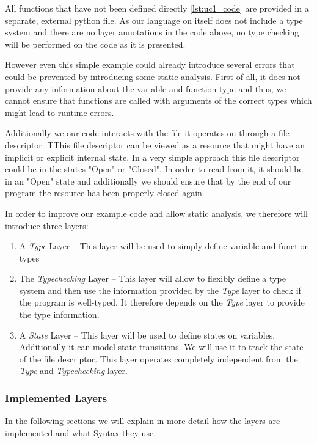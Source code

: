 \documentclass[acmsmall, review, screen]{acmart}
\begin{document}
All functions that have not been defined directly \ref{lst:uc1_code} are provided in a separate, external python file. As our language on itself does not include a type system and there are no layer annotations in the code above, no type checking will be performed on the code as it is presented.

However even this simple example could already introduce several errors that could be prevented by introducing some static analysis. First of all, it does not provide any information about the variable and function type and thus, we cannot ensure that functions are called with arguments of the correct types which might lead to runtime errors.

Additionally we our code interacts with the file it operates on through a file descriptor. TThis file descriptor can be viewed as a resource that might have an implicit or explicit internal state. In a very simple approach this file descriptor could be in the states "Open" or "Closed". In order to read from it, it should be in an "Open" state and additionally we should ensure that by the end of our program the resource has been properly closed again.

In order to improve our example code and allow static analysis, we therefore will introduce three layers:
\begin{enumerate}
	\item A \textit{Type} Layer -- This layer will be used to simply define variable and function types
	\item The \textit{Typechecking} Layer -- This layer will allow to flexibly define a type system and then use the information provided by the \textit{Type} layer to check if the program is well-typed. It therefore depends on the \textit{Type} layer to provide the type information.
	\item A \textit{State} Layer -- This layer will be used to define states on variables. Additionally it can model state transitions. We will use it to track the state of the file descriptor. This layer operates completely independent from the \textit{Type} and \textit{Typechecking} layer.
\end{enumerate}

\subsubsection{Implemented Layers}
In the following sections we will explain in more detail how the layers are implemented and what Syntax they use.
\end{document}
